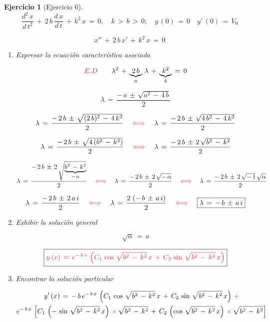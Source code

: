 \documentclass[a4paper,11pt, openany]{book}
\newtheorem{ejer}{Ejercicio}[section]
\newcommand*{\itembolasazules}[1]{%
\footnotesize\protect\tikz[baseline=-3pt]%
\protect\node[scale=.7, circle, shade, ball
color=green]{\color{white}\Large\bf#1};}
\begin{document}
\begin{ejer}[Ejercicio 6]
 
$$\dfrac{d^{2}\,x}{d\,t^{2}}\,+\,2\,b\,\dfrac{d\,x}{d\,t}\,+\,k^{2}\,x\,=\,0, \quad k\,>\,b\,>\,0; \quad y\,(0)\,=\,0 \quad y'\,(0)\,=\,V_{0}$$
 
$$x''\,+\,2\,b\,x'\,+\,k^{2}\,x\,=\,0$$
 
\begin{enumerate}[label=\itembolasazules{\arabic*}]
 
 
\item Expresar la ecuación característica asociada
 
$$\textcolor{lust}{E.D} \qquad \lambda^{2}\,+\,\underbrace{2\,b}_{a}\,\lambda\,+\,\underbrace{k^{2}}_{b}\,=\,0$$
 
$$\boxed{\lambda\,=\,\dfrac{-\,a\,\pm\,\sqrt{a^{2}\,-\,4\,b } }{2} }$$
 
$$\lambda\,=\,\dfrac{-\,2\,b\,\pm\,\sqrt{(2\,b)^{2}\,-\,4\,k^{2} } }{2} \quad \textcolor{lust}{\iff} \quad \lambda\,=\,\dfrac{-\,2\,b\,\pm\,\sqrt{4\,b^{2}\,-\,4\,k^{2} } }{2}$$
 
$$\lambda\,=\,\dfrac{-\,2\,b\,\pm\,\sqrt{4\,(b^{2}\,-\,k^{2}) } }{2} \quad \textcolor{lust}{\iff} \quad \lambda\,=\,\dfrac{-\,2\,b\,\pm\,2\,\sqrt{b^{2}\,-\,k^{2} } }{2}$$
 
$$\lambda\,=\,\dfrac{-\,2\,b\,\pm\,2\,\sqrt{\underbrace{b^{2}\,-\,k^{2}}_{-\,\alpha} } }{2} \quad \textcolor{lust}{\iff} \quad \lambda\,=\,\dfrac{-\,2\,b\,\pm\,2\,\sqrt{-\,\alpha}}{2} \quad \textcolor{lust}{\iff} \quad \lambda\,=\,\dfrac{-\,2\,b\,\pm\,2\,\sqrt{-\,1}\,\sqrt{\alpha}}{2}$$
 
$$\lambda\,=\,\dfrac{-\,2\,b\,\pm\,2\,a\,i}{2} \quad \textcolor{lust}{\iff} \quad \lambda\,=\,\dfrac{2\,\left(-\,b\,\pm\,a\,i\right)}{2} \quad \textcolor{lust}{\iff} \quad \boxed{\lambda\,=\,-\,b\,\pm\,a\,i}$$
 
\item Exhibir la solución general
 
$$\sqrt{\alpha}\,=\,a$$
 
$$\boxed{\textcolor{lust}{y\,(x)\,=\,e^{-\,b\,x}\,\left(C_{1}\,\cos\,\sqrt{b^{2}\,-\,k^{2}}\,x\,+\,C_{2}\,\sin\,\sqrt{b^{2}\,-\,k^{2}}\,x \right)}}$$
 
\item Encontrar la solución particular
 
\begin{multline*}
y'\,(x)\,=\,-\,b\,e^{-\,b\,x}\,\left(C_{1}\,\cos\,\sqrt{b^{2}\,-\,k^{2}}\,x\,+\,C_{2}\,\sin\,\sqrt{b^{2}\,-\,k^{2}}\,x \right)\,\textcolor{lust}{+} \\
e^{-\,b\,x}\,\left[C_{1}\,\left(-\,\sin\,\sqrt{b^{2}\,-\,k^{2}}\,x \right)\,\textcolor{lust}{\times}\,\sqrt{b^{2}\,-\,k^{2}}\,+\,C_{2}\,\left(\cos\,\sqrt{b^{2}\,-\,k^{2}}\,x \right)\,\textcolor{lust}{\times}\,\sqrt{b^{2}\,-\,k^{2}}  \right]   
\end{multline*}
 

\end{enumerate}
\end{ejer}
\end{document}
